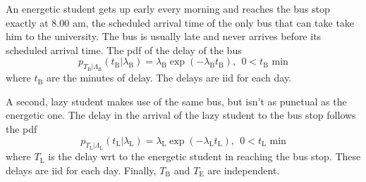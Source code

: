 \begin{solution}
\end{solution}

\else

\question[30] %

An energetic student gets up early every morning and reaches the bus stop exactly at 8.00 am, the scheduled arrival time of the only bus that  can take take him to the university. The bus is usually late and never arrives before its scheduled arrival time. The pdf of the delay of the bus
$$
p_{T_\text{B}|\Lambda_\text{B}}(t_\text{B}|\lambda_\text{B}) = \lambda_\text{B} \exp(-\lambda_\text{B} t_\text{B}),~~0<t_\text{B}\text{ min}
$$
where $t_\text{B}$ are the minutes of delay. The delays are iid for each day.

A second, lazy student makes use of the same bus, but isn't as punctual as the energetic one. The delay in the arrival of the lazy student to the bus stop follows the  pdf
$$
p_{T_\text{L}|\Lambda_\text{L}}(t_\text{L}|\lambda_\text{L}) = \lambda_\text{L} \exp(-\lambda_\text{L} t_\text{L}),~~0<t_\text{L}\text{ min}
$$
where $T_\text{L}$ is the delay wrt to the energetic student in reaching the bus stop.  These delays are iid for each day.
Finally, $T_\text{B}$ and $T_\text{E}$ are independent.

